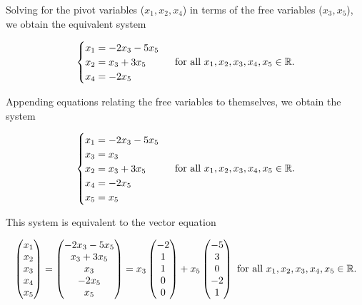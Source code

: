 \begin{example}
     Solving for the pivot variables ($x_1, x_2, x_4$) in terms of the free variables ($x_3, x_5$), we obtain the equivalent system

     \begin{align*}
         \begin{cases}
             x_1 = -2x_3 - 5x_5 \\
             x_2 = x_3 + 3x_5 \\ 
             x_4 = -2x_5
        \end{cases}
        \text{ for all $x_1, x_2, x_3, x_4, x_5 \in \mathbb{R}$}.
     \end{align*}

     Appending equations relating the free variables to themselves, we obtain the system
     
     \begin{align*}
         \begin{cases}
             x_1 = -2x_3 - 5x_5 \\
             x_3 = x_3 \\
             x_2 = x_3 + 3x_5 \\ 
             x_4 = -2x_5 \\
             x_5 = x_5
        \end{cases}
        \text{ for all $x_1, x_2, x_3, x_4, x_5 \in \mathbb{R}$}.
     \end{align*}

     This system is equivalent to the vector equation

    \begin{align*}
        \begin{pmatrix}
            x_1 \\ x_2 \\ x_3 \\ x_4 \\ x_5
        \end{pmatrix}
        =
        \begin{pmatrix}
            -2x_3 - 5x_5 \\
            x_3 + 3x_5 \\
            x_3 \\
            -2x_5 \\
            x_5
        \end{pmatrix}
        =
        x_3
        \begin{pmatrix}
            -2 \\ 1 \\ 1 \\ 0 \\ 0
        \end{pmatrix}
        + x_5
        \begin{pmatrix}
            -5 \\ 3 \\ 0 \\ -2 \\ 1
        \end{pmatrix} \text{ for all $x_1, x_2, x_3, x_4, x_5 \in \mathbb{R}$}.
    \end{align*}


\end{example}
